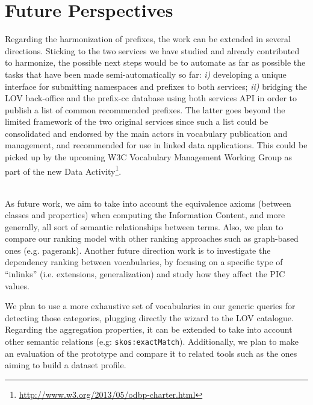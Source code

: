 \section{Future Perspectives}
\label{sec:nextSteps}
Regarding the harmonization of prefixes, the work can be extended in several directions. Sticking to the two services we have studied and already contributed to harmonize, the possible next steps would be to automate as far as possible the tasks that have been made semi-automatically so far: \emph{i)} developing a unique interface for submitting namespaces and prefixes to both services; \emph{ii)} bridging the LOV back-office and the prefix-cc database using both services API in order to publish a list of common recommended prefixes. The latter goes beyond the limited framework of the two original services since such a list could be consolidated and endorsed by the main actors in vocabulary publication and management, and recommended for use in linked data applications. This could be picked up by the upcoming W3C Vocabulary Management Working Group as part of the new Data Activity\footnote{\url{http://www.w3.org/2013/05/odbp-charter.html}}.

 \\
 As future work, we aim to take into account the equivalence axioms (between classes and properties) when computing the Information Content, and more generally, all sort of semantic relationships between terms. Also, we plan to compare our ranking model with other ranking approaches such as graph-based ones (e.g. pagerank). Another future direction work is to investigate the dependency ranking between vocabularies, by focusing on a specific type of ``inlinks'' (i.e. extensions, generalization) and study how they affect the PIC values.
 
 We plan to use a more exhaustive set of vocabularies in our generic queries for detecting those categories, plugging directly the wizard to the LOV catalogue. Regarding the aggregation properties, it can be extended to take into account other semantic relations (e.g: \texttt{skos:exactMatch}). Additionally, we plan to make an evaluation of the prototype and compare it to related tools such as the ones aiming to build a dataset profile.